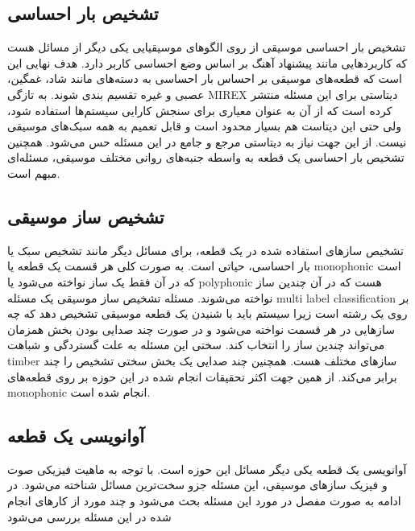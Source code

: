 \subsection{تشخیص بار احساسی}
تشخیص بار احساسی موسیقی از روی الگوهای موسیقیایی یکی دیگر از مسائل هست که
کاربردهایی مانند پیشنهاد آهنگ بر اساس وضع احساسی کاربر دارد. هدف نهایی این است
که قطعه‌های موسیقی بر احساس بار احساسی به دسته‌های مانند شاد، غمگین، عصبی و غیره
تقسیم بندی شوند. به تازگی MIREX دیتاستی برای این مسئله منتشر کرده است که از آن
به عنوان معیاری برای سنجش کارایی سیستم‌ها استفاده شود، ولی حتی این دیتاست هم
بسیار محدود است و قابل تعمیم به همه سبک‌های موسیقی نیست. از این جهت نیاز به
دیتاستی مرجع و جامع در این مسئله حس می‌شود. همچنین تشخیص بار احساسی یک قطعه به
واسطه جنبه‌های روانی مختلف موسیقی، مسئله‌ای مبهم است.

\subsection{تشخیص ساز موسیقی}
تشخیص سازهای استفاده شده در یک قطعه، برای مسائل دیگر مانند تشخیص سبک یا بار
احساسی، حیاتی است. به صورت کلی هر قسمت یک قطعه یا \gls{monophonic} است که در آن
فقط یک ساز نواخته می‌شود یا \gls{polyphonic} هست که در آن چندین ساز نواخته
می‌شوند. مسئله تشخیص ساز موسیقی یک مسئله \gls{multi label classification} بر روی
یک رشته است زیرا سیستم باید با شنیدن یک قطعه موسیقی تشخیص دهد که چه سازهایی در
هر قسمت نواخته می‌شود و در صورت چند صدایی بودن بخش همزمان می‌تواند چندین ساز را
انتخاب کند. سختی این مسئله به علت گستردگی و شباهت \gls{timber} سازهای مختلف هست.
همچنین چند صدایی یک بخش سختی تشخیص را چند برابر می‌کند. از همین جهت اکثر تحقیقات
انجام شده در این حوزه بر روی قطعه‌های \gls{monophonic} انجام شده است.

\subsection{آوانویسی یک قطعه}
آوانویسی یک قطعه یکی دیگر مسائل این حوزه است. با توجه به ماهیت فیزیکی صوت و
فیزیک سازهای موسیقی، این مسئله جزو سخت‌ترین مسائل شناخته می‌شود. در ادامه به
صورت مفصل در مورد این مسئله بحث می‌شود و چند مورد از کارهای انجام شده در این
مسئله بررسی می‌شود

